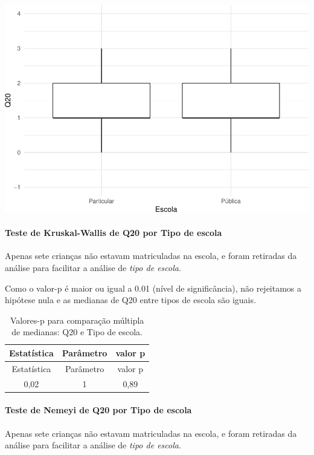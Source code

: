 \documentclass[]{article}
\let\oldparagraph\paragraph
\renewcommand{\paragraph}[1]{\oldparagraph{#1}\mbox{}}
\begin{document}
\begin{center}\includegraphics[width=0.75\linewidth]{relatorio_covid19_files/figure-latex/unnamed-chunk-412-1} \end{center}

\hypertarget{teste-de-kruskal-wallis-de-q20-por-tipo-de-escola}{%
\paragraph{Teste de Kruskal-Wallis de Q20 por Tipo de escola}\label{teste-de-kruskal-wallis-de-q20-por-tipo-de-escola}}

Apenas sete crianças não estavam matriculadas na escola, e foram retiradas da análise para facilitar a análise de \emph{tipo de escola}.

Como o valor-p é maior ou igual a 0.01 (nível de significância), não rejeitamos a hipótese nula e as medianas de Q20 entre tipos de escola são iguais.

\begin{longtable}[]{@{}ccc@{}}
\caption{\label{tab:unnamed-chunk-414}Valores-p para comparação múltipla de medianas: Q20 e Tipo de escola.}\tabularnewline
\toprule
Estatística & Parâmetro & valor p\tabularnewline
\midrule
\endfirsthead
\toprule
Estatística & Parâmetro & valor p\tabularnewline
\midrule
\endhead
0,02 & 1 & 0,89\tabularnewline
\bottomrule
\end{longtable}

\hypertarget{teste-de-nemeyi-de-q20-por-tipo-de-escola}{%
\paragraph{Teste de Nemeyi de Q20 por Tipo de escola}\label{teste-de-nemeyi-de-q20-por-tipo-de-escola}}

Apenas sete crianças não estavam matriculadas na escola, e foram retiradas da análise para facilitar a análise de \emph{tipo de escola}.
\end{document}
